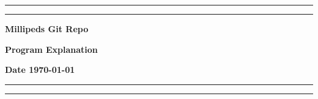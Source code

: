 \documentclass{report}
\begin{document}
\begin{titlepage}
    \begin{center}
        \vspace{0.25cm}
        \hrule
        \vspace{0.1cm}
        \hrule
        \vspace{0.25cm}
        {\LARGE{\textbf{Millipeds Git Repo}}}
        \par
        \vspace{0.25cm}
        {\large{\textbf{Program Explanation}}}
        \par
        \vspace{0.25cm}
        {\large{\textbf{Date \today}}}
        \vspace{0.25cm}
        \hrule
        \vspace{0.1cm}
        \hrule
        \vfill
    \end{center}
\end{titlepage}

\tableofcontents
\par
\newpage
\end{document}
